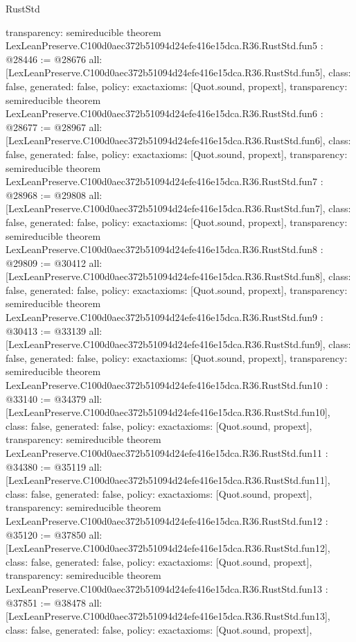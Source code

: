 \begin{lexlean}{RustStd}
\begin{coremodule}
{  transparency: semireducible
}
theorem LexLeanPreserve.C100d0aec372b51094d24efe416e15dca.R36.RustStd.fun5 : @28446 := @28676 {
  all: [LexLeanPreserve.C100d0aec372b51094d24efe416e15dca.R36.RustStd.fun5],
  class: false,
  generated: false,
  policy: exact{axioms: [Quot.sound, propext]},
  transparency: semireducible
}
theorem LexLeanPreserve.C100d0aec372b51094d24efe416e15dca.R36.RustStd.fun6 : @28677 := @28967 {
  all: [LexLeanPreserve.C100d0aec372b51094d24efe416e15dca.R36.RustStd.fun6],
  class: false,
  generated: false,
  policy: exact{axioms: [Quot.sound, propext]},
  transparency: semireducible
}
theorem LexLeanPreserve.C100d0aec372b51094d24efe416e15dca.R36.RustStd.fun7 : @28968 := @29808 {
  all: [LexLeanPreserve.C100d0aec372b51094d24efe416e15dca.R36.RustStd.fun7],
  class: false,
  generated: false,
  policy: exact{axioms: [Quot.sound, propext]},
  transparency: semireducible
}
theorem LexLeanPreserve.C100d0aec372b51094d24efe416e15dca.R36.RustStd.fun8 : @29809 := @30412 {
  all: [LexLeanPreserve.C100d0aec372b51094d24efe416e15dca.R36.RustStd.fun8],
  class: false,
  generated: false,
  policy: exact{axioms: [Quot.sound, propext]},
  transparency: semireducible
}
theorem LexLeanPreserve.C100d0aec372b51094d24efe416e15dca.R36.RustStd.fun9 : @30413 := @33139 {
  all: [LexLeanPreserve.C100d0aec372b51094d24efe416e15dca.R36.RustStd.fun9],
  class: false,
  generated: false,
  policy: exact{axioms: [Quot.sound, propext]},
  transparency: semireducible
}
theorem LexLeanPreserve.C100d0aec372b51094d24efe416e15dca.R36.RustStd.fun10 : @33140 := @34379 {
  all: [LexLeanPreserve.C100d0aec372b51094d24efe416e15dca.R36.RustStd.fun10],
  class: false,
  generated: false,
  policy: exact{axioms: [Quot.sound, propext]},
  transparency: semireducible
}
theorem LexLeanPreserve.C100d0aec372b51094d24efe416e15dca.R36.RustStd.fun11 : @34380 := @35119 {
  all: [LexLeanPreserve.C100d0aec372b51094d24efe416e15dca.R36.RustStd.fun11],
  class: false,
  generated: false,
  policy: exact{axioms: [Quot.sound, propext]},
  transparency: semireducible
}
theorem LexLeanPreserve.C100d0aec372b51094d24efe416e15dca.R36.RustStd.fun12 : @35120 := @37850 {
  all: [LexLeanPreserve.C100d0aec372b51094d24efe416e15dca.R36.RustStd.fun12],
  class: false,
  generated: false,
  policy: exact{axioms: [Quot.sound, propext]},
  transparency: semireducible
}
theorem LexLeanPreserve.C100d0aec372b51094d24efe416e15dca.R36.RustStd.fun13 : @37851 := @38478 {
  all: [LexLeanPreserve.C100d0aec372b51094d24efe416e15dca.R36.RustStd.fun13],
  class: false,
  generated: false,
  policy: exact{axioms: [Quot.sound, propext]},
}
\end{coremodule}
\end{lexlean}
